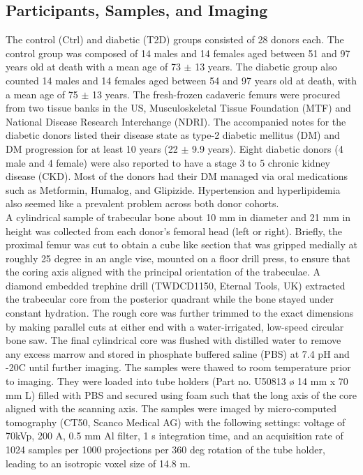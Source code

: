 \documentclass[a4paper,fleqn]{DC_ArtStyle}
\begin{document}
	\subsection{Participants, Samples, and Imaging}
	The control (Ctrl) and diabetic (T2D) groups consisted of 28 donors each.
	The control group was composed of 14 males and 14 females aged between 51 and 97 years old at death with a mean age of 73 $\pm$ 13 years.
	The diabetic group also counted 14 males and 14 females aged between 54 and 97 years old at death, with a mean age of 75 $\pm$ 13 years.
	The fresh-frozen cadaveric femurs were procured from two tissue banks in the US, Musculoskeletal Tissue Foundation (MTF) and National Disease Research Interchange (NDRI).
	The accompanied notes for the diabetic donors listed their disease state as type-2 diabetic mellitus (DM) and DM progression for at least 10 years (22 $\pm$ 9.9 years).
	Eight diabetic donors (4 male  and 4 female) were also reported to have a stage 3 to 5 chronic kidney disease (CKD).
	Most of the donors had their DM managed via oral medications such as Metformin, Humalog, and Glipizide.
	Hypertension and hyperlipidemia also seemed like a prevalent problem across both donor cohorts.
	\\[0.5em]
	A cylindrical sample of trabecular bone about 10 mm in diameter and 21 mm in height was collected from each donor's femoral head (left or right).
	Briefly, the proximal femur was cut to obtain a cube like section that was gripped medially at roughly 25 degree in an angle vise, mounted on a floor drill press, to ensure that the coring axis aligned with the principal orientation of the trabeculae.
	A diamond embedded trephine drill (TWDCD1150, Eternal Tools, UK) extracted the trabecular core from the posterior quadrant while the bone stayed under constant hydration.
	The rough core was further trimmed to the exact dimensions by making parallel cuts at either end with a water-irrigated, low-speed circular bone saw.
	The final cylindrical core was flushed with distilled water to remove any excess marrow and stored in phosphate buffered saline (PBS) at 7.4 pH and -20C until further imaging.
	The samples were thawed to room temperature prior to imaging.
	They were loaded into tube holders (Part no. U50813 ø 14 mm x 70 mm L) filled with PBS and secured using foam such that the long axis of the core aligned with the scanning axis.
	The samples were imaged by micro-computed tomography (\textmu CT50, Scanco Medical AG) with the following settings: voltage of 70kVp, 200 \textmu A, 0.5 mm Al filter, 1 s integration time, and an acquisition rate of 1024 samples per 1000 projections per 360 deg rotation of the tube holder, leading to an isotropic voxel size of 14.8 \textmu m.
   
\end{document}
